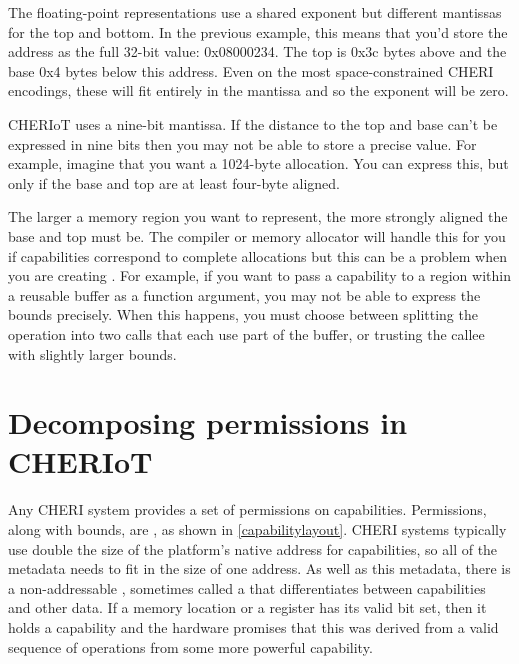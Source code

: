 The floating-point representations use a shared exponent but different mantissas for the top and bottom.
In the previous example, this means that you'd store the address as the full 32-bit value: 0x08000234.
The top is 0x3c bytes above and the base 0x4 bytes below this address.
Even on the most space-constrained CHERI encodings, these will fit entirely in the mantissa and so the exponent will be zero.

CHERIoT uses a nine-bit mantissa.
If the distance to the top and base can't be expressed in nine bits then you may not be able to store a precise value.
For example, imagine that you want a 1024-byte allocation.
You can express this, but only if the base and top are at least four-byte aligned.

The larger a memory region you want to represent, the more strongly aligned the base and top must be.
The compiler or memory allocator will handle this for you if capabilities correspond to complete allocations but this can be a problem when you are creating .
For example, if you want to pass a capability to a region within a reusable buffer as a function argument, you may not be able to express the bounds precisely.
When this happens, you must choose between splitting the operation into two calls that each use part of the buffer, or trusting the callee with slightly larger bounds.

\section[label=permissions]{Decomposing permissions in CHERIoT}


Any CHERI system provides a set of permissions on capabilities.
Permissions, along with bounds, are , as shown in \ref{capabilitylayout}.
CHERI systems typically use double the size of the platform's native address for capabilities, so all of the metadata needs to fit in the size of one address.
As well as this metadata, there is a non-addressable , sometimes called a  that differentiates between capabilities and other data.
If a memory location or a register has its valid bit set, then it holds a capability and the hardware promises that this was derived from a valid sequence of operations from some more powerful capability.

